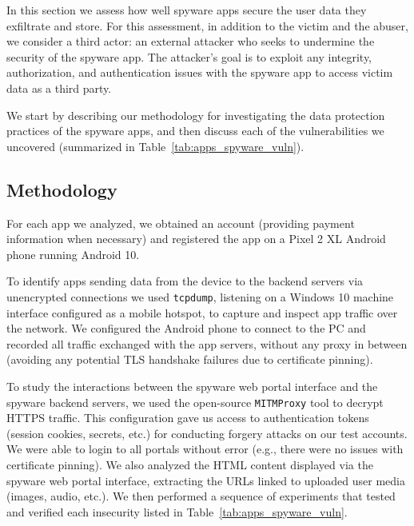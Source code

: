\documentclass[sigconf,balance=false]{acmart}
\newcommand{\sumanth}[1]{\textcolor{violet}{\noindent[SR: #1]}}
\newcommand{\sumanth}[1]{}
\begin{document}
In this section we assess how well spyware apps secure the user data they exfiltrate and store.
For this assessment, in addition to the victim and the abuser, we
consider a third actor: an external attacker who seeks to undermine the
security of the spyware app.  The attacker's goal is to exploit any
integrity, authorization, and authentication issues with the spyware
app to access victim data as a third party.



We start by describing our
methodology for investigating the data protection practices of the
spyware apps, and then discuss each of the vulnerabilities we uncovered (summarized in Table~\ref{tab:apps_spyware_vuln}).

\subsection{Methodology}
\label{subsec:experiemental_setup}

For each app we analyzed, we obtained an account (providing payment
information when necessary) and registered the app on a Pixel 2 XL
Android phone running Android 10.

To identify apps sending data from the device to the backend servers via unencrypted connections we used \texttt{tcpdump},
listening on a Windows 10 machine interface configured as a mobile
hotspot, to capture and inspect app traffic over the network.  We
configured the Android phone to connect to the PC and recorded all
traffic exchanged with the app servers, without any proxy in between
(avoiding any potential TLS handshake failures due to certificate
pinning).

To study the interactions between the spyware web portal interface and
the spyware backend servers, we used the open-source \texttt{MITMProxy} tool to
decrypt HTTPS traffic.  This configuration gave us access to
authentication tokens (session cookies, secrets, etc.) for conducting
forgery attacks on our test accounts.  We were able to login to all
portals without error (e.g., there were no issues with certificate
pinning).  We also analyzed the HTML content displayed via the spyware
web portal interface, extracting the URLs linked to uploaded user
media (images, audio, etc.).  We then performed a sequence of
experiments that tested and verified each insecurity listed in
Table~\ref{tab:apps_spyware_vuln}.
\end{document}
